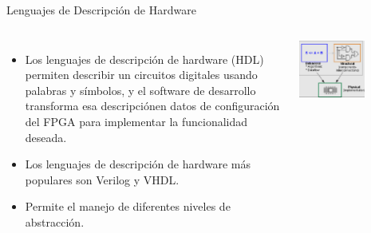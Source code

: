 \begin{frame}{Lenguajes de Descripción de Hardware}
\begin{columns}
\begin{itemize}
\item Los lenguajes de descripción de hardware (HDL) permiten describir un circuitos digitales usando palabras y símbolos, y el software de desarrollo transforma esa descripciónen datos de configuración del FPGA para implementar la funcionalidad deseada.
\item Los lenguajes de descripción de hardware más populares son Verilog y VHDL. 
\item Permite el manejo de diferentes niveles de abstracción. 
\end{itemize}
\begin{center}
        \includegraphics[width=0.6\textwidth]{Figs/NivelesAbstraccion}
\end{center}	
	  
\end{columns}
\end{frame}


